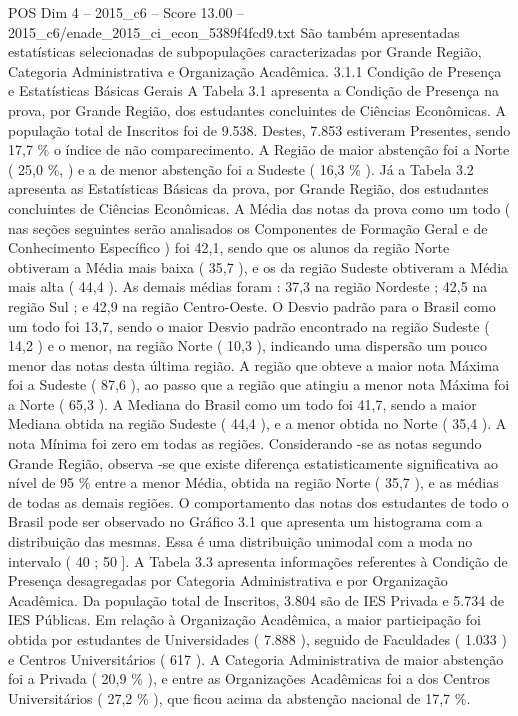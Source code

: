 \begin{textsample}{POS Dim 4 – 2015\_c6 – Score 13.00 – 2015\_c6/enade\_2015\_ci\_econ\_5389f4fcd9.txt}
São também apresentadas estatísticas selecionadas de subpopulações caracterizadas por Grande Região, Categoria Administrativa e Organização Acadêmica. 3.1.1 Condição de Presença e Estatísticas Básicas Gerais A Tabela 3.1 apresenta a Condição de Presença na prova, por Grande Região, dos estudantes concluintes de Ciências Econômicas.
A população total de Inscritos foi de 9.538.
Destes, 7.853 estiveram Presentes, sendo 17,7 \% o índice de não comparecimento.
A Região de maior abstenção foi a Norte ( 25,0 \%, ) e a de menor abstenção foi a Sudeste ( 16,3 \% ).
Já a Tabela 3.2 apresenta as Estatísticas Básicas da prova, por Grande Região, dos estudantes concluintes de Ciências Econômicas.
A Média das notas da prova como um todo ( nas seções seguintes serão analisados os Componentes de Formação Geral e de Conhecimento Específico ) foi 42,1, sendo que os alunos da região Norte obtiveram a Média mais baixa ( 35,7 ), e os da região Sudeste obtiveram a Média mais alta ( 44,4 ).
As demais médias foram : 37,3 na região Nordeste ; 42,5 na região Sul ; e 42,9 na região Centro-Oeste.
O Desvio padrão para o Brasil como um todo foi 13,7, sendo o maior Desvio padrão encontrado na região Sudeste ( 14,2 ) e o menor, na região Norte ( 10,3 ), indicando uma dispersão um pouco menor das notas desta última região.
A região que obteve a maior nota Máxima foi a Sudeste ( 87,6 ), ao passo que a região que atingiu a menor nota Máxima foi a Norte ( 65,3 ).
A Mediana do Brasil como um todo foi 41,7, sendo a maior Mediana obtida na região Sudeste ( 44,4 ), e a menor obtida no Norte ( 35,4 ).
A nota Mínima foi zero em todas as regiões.
Considerando -se as notas segundo Grande Região, observa -se que existe diferença estatisticamente significativa ao nível de 95 \% entre a menor Média, obtida na região Norte ( 35,7 ), e as médias de todas as demais regiões.
O comportamento das notas dos estudantes de todo o Brasil pode ser observado no Gráfico 3.1 que apresenta um histograma com a distribuição das mesmas.
Essa é uma distribuição unimodal com a moda no intervalo ( 40 ; 50 ].
A Tabela 3.3 apresenta informações referentes à Condição de Presença desagregadas por Categoria Administrativa e por Organização Acadêmica.
Da população total de Inscritos, 3.804 são de IES Privada e 5.734 de IES Públicas.
Em relação à Organização Acadêmica, a maior participação foi obtida por estudantes de Universidades ( 7.888 ), seguido de Faculdades ( 1.033 ) e Centros Universitários ( 617 ).
A Categoria Administrativa de maior abstenção foi a Privada ( 20,9 \% ), e entre as Organizações Acadêmicas foi a dos Centros Universitários ( 27,2 \% ), que ficou acima da abstenção nacional de 17,7 \%.

\end{textsample}

